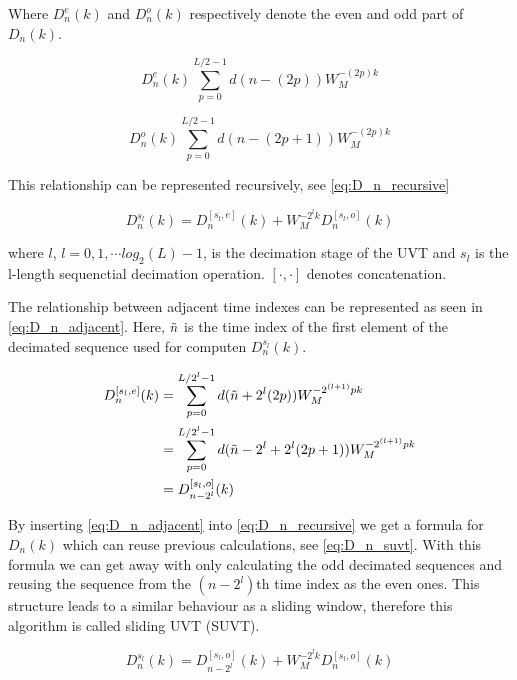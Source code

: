 \documentclass[../main.tex]{subfiles}
\begin{document}
Where $D_n^e(k)$ and $D_n^o(k)$ respectively denote the even and odd part of $D_n(k)$.

\begin{equation}
    \label{eq:decimation_even}
    D_n^e(k) \sum_{p=0}^{L/2-1} d(n-(2p)) W_{M}^{-(2p)k}
\end{equation}

\begin{equation}
    \label{eq:decimation_odd}
    D_n^o(k) \sum_{p=0}^{L/2-1} d(n-(2p+1)) W_{M}^{-(2p)k}
\end{equation}

This relationship can be represented recursively, see \eqref{eq:D_n_recursive}

\begin{equation}
    \label{eq:D_n_recursive}
    D_n^{s_l}(k) = D_n^{[s_l,e]}(k) + W_{M}^{-2^lk}D_n^{[s_l,o]}(k)
\end{equation}

where $l$, $l = 0, 1, \cdots log_2(L)-1$, is the decimation stage of the UVT and $s_l$ is the l-length sequenctial decimation operation. $[\cdot,\cdot]$ denotes concatenation.

The relationship between adjacent time indexes can be represented as seen in \eqref{eq:D_n_adjacent}.
Here, $\Tilde{n}$ is the time index of the first element of the decimated sequence used for computen $D_n^{s_l}(k)$.

\begin{align}
    \label{eq:D_n_adjacent}
    D_n^{[s_l,e]}(k) &= \sum_{p=0}^{L/2^l-1} d(\Tilde{n} + 2^l(2p))W_{M}^{-2^{(l+1)}pk} \nonumber\\
                     &= \sum_{p=0}^{L/2^l-1} d(\Tilde{n} - 2^{l} + 2^l(2p+1))W_{M}^{-2^{(l+1)}pk} \nonumber\\
                     &= D_{n-2^l}^{[s_l,o]}(k) 
\end{align}

By inserting \eqref{eq:D_n_adjacent} into \eqref{eq:D_n_recursive} we get a formula for $D_n(k)$ which can reuse previous calculations, see \eqref{eq:D_n_suvt}.
With this formula we can get away with only calculating the odd decimated sequences and reusing the sequence from the $(n-2^l)$th time index as the even ones.
This structure leads to a similar behaviour as a sliding window, therefore this algorithm is called sliding UVT (SUVT).

\begin{equation}
    \label{eq:D_n_suvt}
    D_{n}^{s_l}(k) = D_{n-2^{l}}^{[s_l,o]}(k) + W_{M}^{-2^{l}k} D_{n}^{[s_l,o]}(k)
\end{equation}
\end{document}
